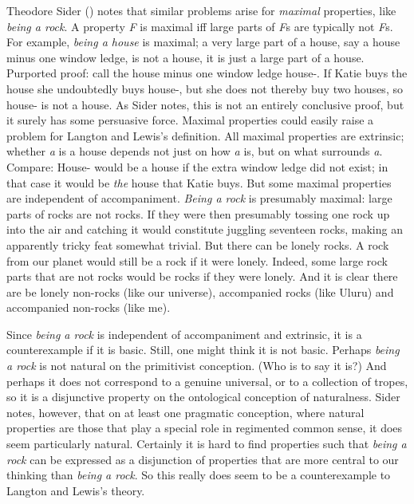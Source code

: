 \documentclass[
  10pt,
  letterpaper,
  DIV=11,
  numbers=noendperiod,
  twoside]{scrartcl}
\begin{document}
Theodore Sider () notes that similar
problems arise for \emph{maximal} properties, like \emph{being a rock}.
A property \emph{F} is maximal iff large parts of \emph{F}s are
typically not \emph{F}s. For example, \emph{being a house} is maximal; a
very large part of a house, say a house minus one window ledge, is not a
house, it is just a large part of a house. Purported proof: call the
house minus one window ledge house-. If Katie buys the house she
undoubtedly buys house-, but she does not thereby buy two houses, so
house- is not a house. As Sider notes, this is not an entirely
conclusive proof, but it surely has some persuasive force. Maximal
properties could easily raise a problem for Langton and Lewis's
definition. All maximal properties are extrinsic; whether \emph{a} is a
house depends not just on how \emph{a} is, but on what surrounds
\emph{a}. Compare: House- would be a house if the extra window ledge did
not exist; in that case it would be \emph{the} house that Katie buys.
But some maximal properties are independent of accompaniment.
\emph{Being a rock} is presumably maximal: large parts of rocks are not
rocks. If they were then presumably tossing one rock up into the air and
catching it would constitute juggling seventeen rocks, making an
apparently tricky feat somewhat trivial. But there can be lonely rocks.
A rock from our planet would still be a rock if it were lonely. Indeed,
some large rock parts that are not rocks would be rocks if they were
lonely. And it is clear there are be lonely non-rocks (like our
universe), accompanied rocks (like Uluru) and accompanied non-rocks
(like me).

Since \emph{being a rock} is independent of accompaniment and extrinsic,
it is a counterexample if it is basic. Still, one might think it is not
basic. Perhaps \emph{being a rock} is not natural on the primitivist
conception. (Who is to say it is?) And perhaps it does not correspond to
a genuine universal, or to a collection of tropes, so it is a
disjunctive property on the ontological conception of naturalness. Sider
notes, however, that on at least one pragmatic conception, where natural
properties are those that play a special role in regimented common
sense, it does seem particularly natural. Certainly it is hard to find
properties such that \emph{being a rock} can be expressed as a
disjunction of properties that are more central to our thinking than
\emph{being a rock}. So this really does seem to be a counterexample to
Langton and Lewis's theory.
\end{document}
